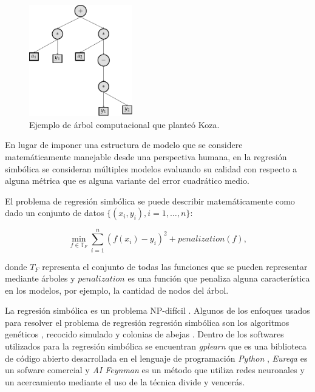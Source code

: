 \begin{center}
    \begin{figure}[h]
        \centering
        \includegraphics[width=0.4\textwidth]{"figures/koza_tree_example.pdf"}
        \caption{Ejemplo de árbol computacional que planteó Koza.}
        \label{tikzpicture:koza_tree_example}
    \end{figure}
\end{center}

En lugar de imponer una estructura de modelo que se considere matemáticamente manejable desde una perspectiva humana, en la regresión simbólica se consideran múltiples modelos evaluando su calidad con respecto a alguna métrica que es alguna variante del error cuadrático medio.

El problema de regresión simbólica se puede describir matemáticamente como dado un conjunto de datos $\{(x_i, y_i), i = 1, \dots, n\}$:

$$\min_{f\in\mathbb{T}_F} \sum_{i=1}^n (f(x_i) - y_i)^2 + penalization(f),$$

donde $T_F$ representa el conjunto de todas las funciones que se pueden representar mediante árboles y $penalization$ es una función que penaliza alguna característica en los modelos, por ejemplo, la cantidad de nodos del árbol.

La regresión simbólica  es un problema NP-difícil \cite{virgolin2022symbolic}. Algunos de los enfoques usados para resolver el problema de regresión regresión simbólica son los algoritmos genéticos \cite{koza1994genetic, schmidt2013eureqa, gaucel2014learning}, recocido simulado \cite{turing_bot} y colonias de abejas \cite{multihive,karaboga2010artificial}. Dentro de los softwares utilizados para la regresión simbólica se encuentran \textit{gplearn} que es una biblioteca de código abierto desarrollada en el lenguaje de programación \textit{Python} \cite{gplearn}, \textit{Eureqa} es un sofware  comercial \cite{schmidt2013eureqa} y \textit{AI Feynman} es un método que utiliza redes neuronales y un acercamiento mediante el uso de la técnica divide y vencerás\cite{udrescu2020ai}.


